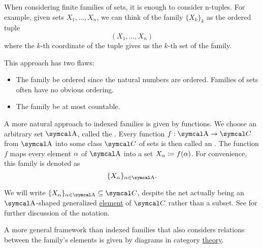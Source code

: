 \begin{definition}\label{def:indexed_family}
  When considering finite families of sets, it is enough to consider n-tuples. For example, given sets \( X_1, \ldots, X_n \), we can think of the family \( \{ X_k \}_k \) as the ordered tuple
  \begin{equation*}
    (X_1, \ldots, X_n)
  \end{equation*}
  where the \( k \)-th coordinate of the tuple gives us the \( k \)-th set of the family.

  This approach has two flaws:
  \begin{itemize}
    \item The family  be ordered since the natural numbers are ordered. Families of sets often have no obvious ordering.
    \item The family  be at most countable.
  \end{itemize}

  A more natural approach to indexed families is given by functions. We choose an arbitrary set \( \CA \), called the . Every function \( f: \CA \to \Cal C \) from \( \CA \) into some class \( \Cal C \) of sets is then called an . The function \( f \) maps every element \( \alpha \) of \( \CA \) into a set \( X_\alpha \coloneqq f(\alpha) \). For convenience, this family is denoted as
  \begin{equation*}
    \{ X_\al \}_{\al \in \CA}.
  \end{equation*}

  We will write \( \{ X_\al \}_{\al \in \CA} \subseteq \Cal{C} \), despite the net actually being an \( \CA \)-shaped generalized \hyperref[def:generalized_element]{element} of \( \Cal{C} \) rather than a subset. See  for further discussion of the notation.

  A more general framework than indexed families that also considers relations between the family's elements is given by diagrams in category \hyperref[def:categorical_diagram]{theory}.
\end{definition}

